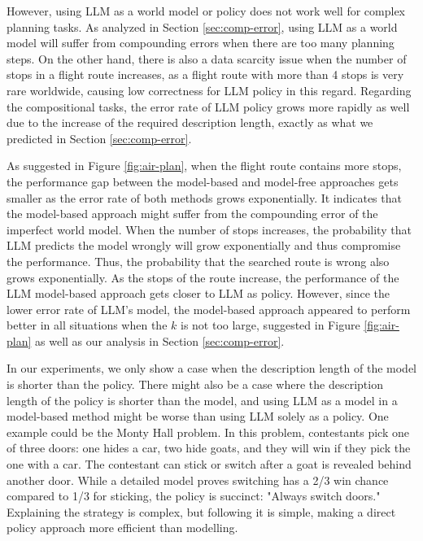 However, using LLM as a world model or policy does not work well for complex planning tasks. As analyzed in Section \ref{sec:comp-error}, using LLM as a world model will suffer from compounding errors when there are too many planning steps. On the other hand, there is also a data scarcity issue when the number of stops in a flight route increases, as a flight route with more than 4 stops is very rare worldwide, causing low correctness for LLM policy in this regard. Regarding the compositional tasks, the error rate of LLM policy grows more rapidly as well due to the increase of the required description length, exactly as what we predicted in Section \ref{sec:comp-error}. 

As suggested in Figure \ref{fig:air-plan}, when the flight route contains more stops, the performance gap between the model-based and model-free approaches gets smaller as the error rate of both methods grows exponentially. It indicates that the model-based approach might suffer from the compounding error of the imperfect world model. When the number of stops increases, the probability that LLM predicts the model wrongly will grow exponentially and thus compromise the performance. 
Thus, the probability that the searched route is wrong also grows exponentially. As the stops of the route increase, the performance of the LLM model-based approach gets closer to LLM as policy. However, since the lower error rate of LLM's model, the model-based approach appeared to perform better in all situations when the $k$ is not too large, suggested in Figure \ref{fig:air-plan} as well as our analysis in Section \ref{sec:comp-error}. 



In our experiments, we only show a case when the description length of the model is shorter than the policy. There might also be a case where the description length of the policy is shorter than the model, and using LLM as a model in a model-based method might be worse than using LLM solely as a policy. One example could be the Monty Hall problem. In this problem, contestants pick one of three doors: one hides a car, two hide goats, and they will win if they pick the one with a car. The contestant can stick or switch after a goat is revealed behind another door. While a detailed model proves switching has a 2/3 win chance compared to 1/3 for sticking, the policy is succinct: "Always switch doors." Explaining the strategy is complex, but following it is simple, making a direct policy approach more efficient than modelling.

